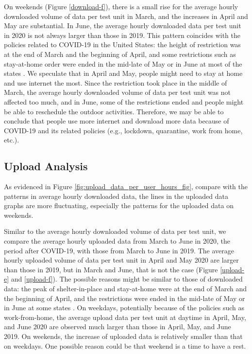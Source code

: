 On weekends (Figure \ref{download-f}), there is a small rise for the average hourly downloaded volume of data per test unit in March, and the increases in April and May are substantial. In June, the average hourly downloaded data per test unit in 2020 is not always larger than those in 2019. This pattern coincides with the policies related to COVID-19 in the United States: the height of restriction was at the end of March and the beginning of April, and some restrictions such as stay-at-home order were ended in the mid-late of May or in June at most of the states \cite{covid19restriction}. We speculate that in April and May, people might need to stay at home and use internet the most. Since the restriction took place in the middle of March, the average hourly downloaded volume of data per test unit was not affected too much, and in June, some of the restrictions ended and people might be able to reschedule the outdoor activities. Therefore, we may be able to conclude that people use more internet and download more data because of COVID-19 and its related policies (e.g., lockdown, quarantine, work from home, etc.).

\subsection{Upload Analysis}
\label{sec:upload-analysis}

As evidenced in Figure \ref{fig:upload_data_per_user_hours_fig}, compare with the patterns in average hourly downloaded data, the lines in the uploaded data graphs are more fluctuating, especially the patterns for the uploaded data on weekends.

Similar to the average hourly downloaded volume of data per test unit, we compare the average hourly uploaded data from March to June in 2020, the period after COVID-19, with those from March to June in 2019. The average hourly uploaded volume of data per test unit in April and May 2020 are larger than those in 2019, but in March and June, that is not the case (Figure \ref{upload-e} and \ref{upload-f}). The possible reasons might be similar to those of downloaded data: the peak of shelter-in-place and stay-at-home were
at the end of March and the beginning of April, and the restrictions were ended in the mid-late of May or in June at some states \cite{covid19restriction}. On weekdays, potentially because of the policies such as work-from-home, the average upload data per test unit at daytime in April, May, and June 2020 are observed much larger than those in April, May, and June 2019. On weekends, the increase of uploaded data is relatively smaller than that on weekdays. One possible reason could be that weekend is a time to have a rest.